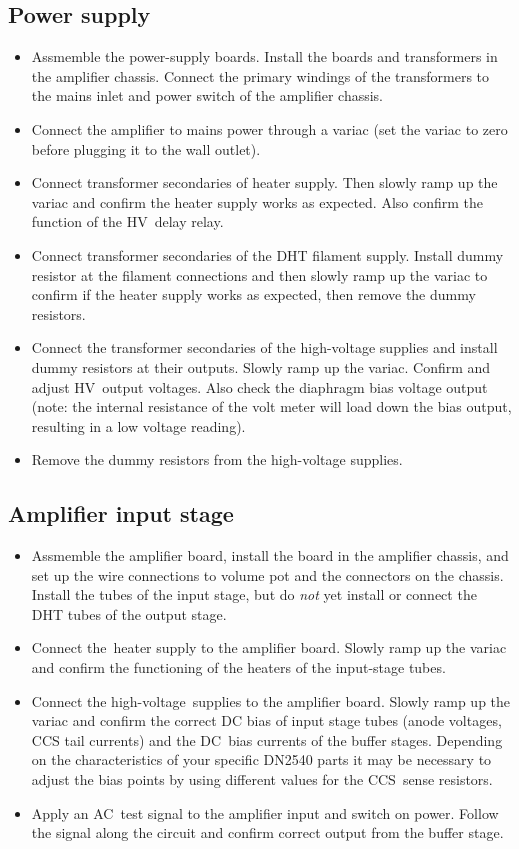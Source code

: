 \subsection{Power supply}
\begin{itemize}
\item Assmemble the power-supply boards. Install the boards and transformers in the amplifier chassis. Connect the primary windings of the transformers to the mains inlet and power switch of the amplifier chassis.
\item Connect the amplifier to mains power through a variac (set the variac to zero before plugging it to the wall outlet).
\item Connect transformer secondaries of heater supply. Then slowly ramp up the variac and confirm the heater supply works as expected. Also confirm the function of the HV delay relay.
\item Connect transformer secondaries of the DHT filament supply. Install dummy resistor at the filament connections and then slowly ramp up the variac to confirm if the heater supply works as expected, then remove the dummy resistors.
\item Connect the transformer secondaries of the high-voltage supplies and install dummy resistors at their outputs. Slowly ramp up the variac. Confirm and adjust HV output voltages. Also check the diaphragm bias voltage output (note: the internal resistance of the volt meter will load down the bias output, resulting in a low voltage reading).
\item Remove the dummy resistors from the high-voltage supplies.
\end{itemize}


\subsection{Amplifier input stage}
\begin{itemize}
\item Assmemble the amplifier board, install the board in the amplifier chassis, and set up the wire connections to volume pot and the connectors on the chassis. Install the tubes of the input stage, but do \emph{not} yet install or connect the DHT tubes of the output stage.
\item Connect the heater supply to the amplifier board. Slowly ramp up the variac and confirm the functioning of the heaters of the input-stage tubes.
\item Connect the high-voltage supplies to the amplifier board. Slowly ramp up the variac and confirm the correct DC bias of input stage tubes (anode voltages, CCS tail currents) and the DC bias currents of the buffer stages. Depending on the characteristics of your specific DN2540 parts it may be necessary to adjust the bias points by using different values for the CCS sense resistors.
\item Apply an AC test signal to the amplifier input and switch on power. Follow the signal along the circuit and confirm correct output from the buffer stage.
\end{itemize}


